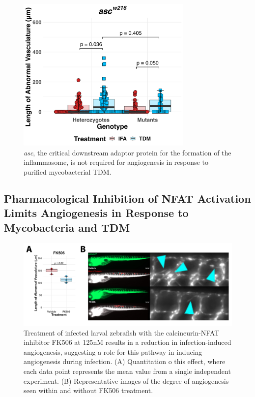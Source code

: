\begin{figure}
\centering
\includegraphics[height=3in]{images/asc_tdm_110922.png}
\caption[\textit{asc} is dispensable for angiogenesis]{\textit{asc}, the critical downstream adaptor protein for the formation of the inflammasome, is not required for angiogenesis in response to purified mycobacterial TDM.}
\label{figure:asc}
\end{figure}

\subsection{Pharmacological Inhibition of NFAT Activation Limits Angiogenesis in Response to Mycobacteria and TDM}

\begin{figure}
\centering
\includegraphics[width=\textwidth]{images/fk506inf.pdf}
\caption[FK506 treatment inhibits angiogenesis during infection]{Treatment of infected larval zebrafish with the calcineurin\hyp{}NFAT inhibitor FK506 at 125nM results in a reduction in infection\hyp{}induced angiogenesis, suggesting a role for this pathway in inducing angiogenesis during infection. (A) Quantitation o this effect, where each data point represents the mean value from a single independent experiment. (B) Representative images of the degree of angiogenesis seen within and without FK506 treatment.}
\label{figure:fk506inf}
\end{figure}

